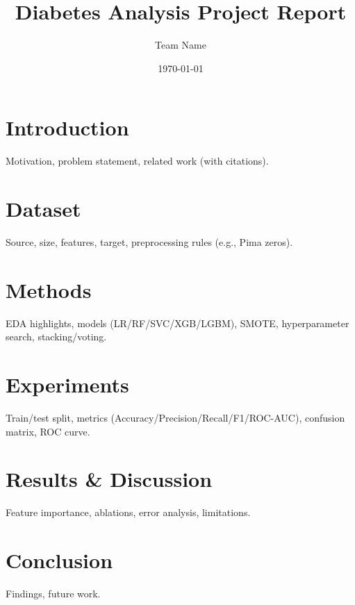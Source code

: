 \documentclass[11pt]{article}
\title{Diabetes Analysis Project Report}
\author{Team Name}
\date{\today}
\begin{document}
\maketitle

\section{Introduction}
Motivation, problem statement, related work (with citations).

\section{Dataset}
Source, size, features, target, preprocessing rules (e.g., Pima zeros).

\section{Methods}
EDA highlights, models (LR/RF/SVC/XGB/LGBM), SMOTE, hyperparameter search, stacking/voting.

\section{Experiments}
Train/test split, metrics (Accuracy/Precision/Recall/F1/ROC-AUC), confusion matrix, ROC curve.

\section{Results \& Discussion}
Feature importance, ablations, error analysis, limitations.

\section{Conclusion}
Findings, future work.



\end{document}
